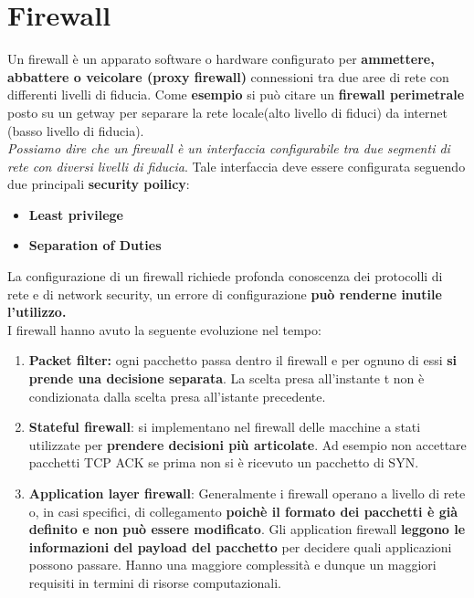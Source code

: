 \documentclass[12pt]{article}
\begin{document}
	\section{Firewall}
		Un firewall è un apparato software o hardware configurato per \textbf{ammettere, abbattere o veicolare (proxy firewall)} connessioni tra due aree di rete con differenti livelli di fiducia. Come \textbf{esempio} si può citare un \textbf{firewall perimetrale } posto su un getway per separare la rete locale(alto livello di fiduci) da internet (basso livello di fiducia).\\
		\textit{Possiamo dire che un firewall è un interfaccia configurabile tra due segmenti di rete con diversi livelli di fiducia}. Tale interfaccia deve essere configurata seguendo due principali \textbf{security poilicy}:
		\begin{itemize}
			\item \textbf{Least privilege}
			\item \textbf{Separation of Duties}
		\end{itemize}
		La configurazione di un firewall richiede profonda conoscenza dei protocolli di rete e di network security, un errore di configurazione \textbf{può renderne inutile l'utilizzo.}\\
		I firewall hanno avuto la seguente evoluzione nel tempo:
		\begin{enumerate}
			\item \textbf{Packet filter:} ogni pacchetto passa dentro il firewall e per ognuno di essi \textbf{si prende una decisione separata}. La scelta presa all'instante t non è condizionata dalla scelta presa all'istante precedente.
			\item \textbf{Stateful firewall}: si implementano nel firewall delle macchine a stati utilizzate per \textbf{prendere decisioni più articolate}. Ad esempio non accettare pacchetti TCP ACK se prima non si è ricevuto un pacchetto di SYN.
			\item \textbf{Application layer firewall}: Generalmente i firewall operano a livello di rete o, in casi specifici, di collegamento \textbf{poichè il formato dei pacchetti è già definito e non può essere modificato}. Gli application firewall \textbf{leggono le informazioni del payload del pacchetto} per decidere quali applicazioni possono passare. Hanno una maggiore complessità e dunque un maggiori requisiti in termini di risorse computazionali.
		\end{enumerate}
\end{document}
